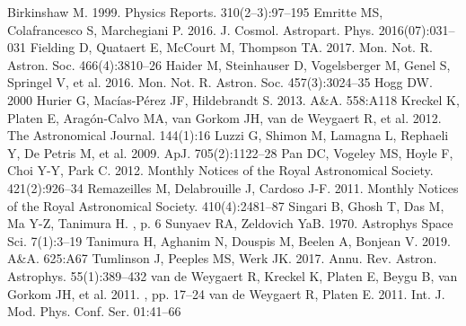 \newline
Birkinshaw M. 1999. Physics Reports. 310(2–3):97–195
\newline
Emritte MS, Colafrancesco S, Marchegiani P. 2016. J. Cosmol. Astropart. Phys. 2016(07):031–031
\newline
Fielding D, Quataert E, McCourt M, Thompson TA. 2017. Mon. Not. R. Astron. Soc. 466(4):3810–26
\newline
Haider M, Steinhauser D, Vogelsberger M, Genel S, Springel V, et al. 2016. Mon. Not. R. Astron. Soc. 457(3):3024–35
\newline
Hogg DW. 2000
\newline
Hurier G, Macías-Pérez JF, Hildebrandt S. 2013. A&A. 558:A118
\newline
Kreckel K, Platen E, Aragón-Calvo MA, van Gorkom JH, van de Weygaert R, et al. 2012. The Astronomical Journal. 144(1):16
\newline
Luzzi G, Shimon M, Lamagna L, Rephaeli Y, De Petris M, et al. 2009. ApJ. 705(2):1122–28
\newline
Pan DC, Vogeley MS, Hoyle F, Choi Y-Y, Park C. 2012. Monthly Notices of the Royal Astronomical Society. 421(2):926–34
\newline
Remazeilles M, Delabrouille J, Cardoso J-F. 2011. Monthly Notices of the Royal Astronomical Society. 410(4):2481–87
\newline
Singari B, Ghosh T, Das M, Ma Y-Z, Tanimura H. , p. 6
\newline
Sunyaev RA, Zeldovich YaB. 1970. Astrophys Space Sci. 7(1):3–19
\newline
Tanimura H, Aghanim N, Douspis M, Beelen A, Bonjean V. 2019. A&A. 625:A67
\newline
Tumlinson J, Peeples MS, Werk JK. 2017. Annu. Rev. Astron. Astrophys. 55(1):389–432
\newline
van de Weygaert R, Kreckel K, Platen E, Beygu B, van Gorkom JH, et al. 2011. , pp. 17–24
\newline
van de Weygaert R, Platen E. 2011. Int. J. Mod. Phys. Conf. Ser. 01:41–66